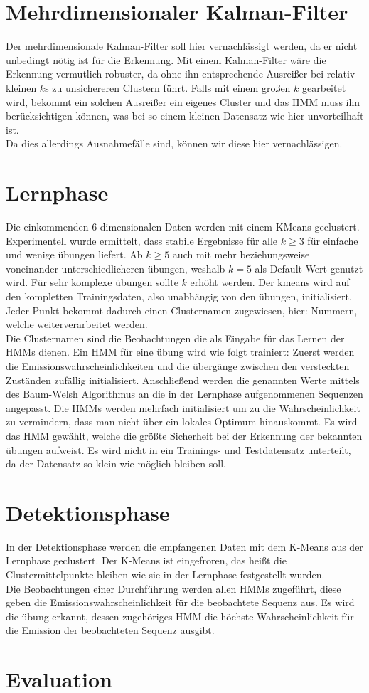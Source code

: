 \documentclass{article}
\begin{document}
\section{Mehrdimensionaler Kalman-Filter}
Der mehrdimensionale Kalman-Filter soll hier vernachl\"assigt werden, da er nicht unbedingt n\"otig ist f\"ur die Erkennung.
Mit einem Kalman-Filter w\"are die Erkennung vermutlich robuster, da ohne ihn entsprechende Ausreißer bei relativ kleinen $k$s zu unsichereren Clustern f\"uhrt.
Falls mit einem großen $k$ gearbeitet wird, bekommt ein solchen Ausreißer ein eigenes Cluster und das HMM muss ihn ber\"ucksichtigen k\"onnen, was bei so einem kleinen Datensatz wie hier unvorteilhaft ist.\\
Da dies allerdings Ausnahmef\"alle sind, k\"onnen wir diese hier vernachl\"assigen.

\section{Lernphase}
Die einkommenden 6-dimensionalen Daten werden mit einem KMeans geclustert.
Experimentell wurde ermittelt, dass stabile Ergebnisse f\"ur alle $k \geq 3$  f\"ur einfache und wenige \"ubungen liefert.
Ab $k \geq 5$ auch mit mehr beziehungsweise voneinander unterschiedlicheren \"ubungen, weshalb $k = 5$ als Default-Wert genutzt wird.
F\"ur sehr komplexe \"ubungen sollte $k$ erh\"oht werden.
Der kmeans wird auf den kompletten Trainingsdaten, also unabh\"angig von den \"ubungen, initialisiert.
Jeder Punkt bekommt dadurch einen Clusternamen zugewiesen, hier: Nummern, welche weiterverarbeitet werden.\\
Die Clusternamen sind die Beobachtungen die als Eingabe f\"ur das Lernen der HMMs dienen.
Ein HMM f\"ur eine \"ubung wird wie folgt trainiert:
Zuerst werden die Emissionswahrscheinlichkeiten und die \"uberg\"ange zwischen den versteckten Zust\"anden zuf\"allig initialisiert.
Anschließend werden die genannten Werte mittels des Baum-Welsh Algorithmus an die in der Lernphase aufgenommenen Sequenzen angepasst.
Die HMMs werden mehrfach initialisiert um zu die Wahrscheinlichkeit zu vermindern, dass man nicht \"uber ein lokales Optimum hinauskommt.
Es wird das HMM gew\"ahlt, welche die gr\"oßte Sicherheit bei der Erkennung der bekannten \"ubungen aufweist.
Es wird nicht in ein Trainings- und Testdatensatz unterteilt, da der Datensatz so klein wie m\"oglich bleiben soll.

\section{Detektionsphase}
In der Detektionsphase werden die empfangenen Daten mit dem K-Means aus der Lernphase geclustert.
Der K-Means ist eingefroren, das heißt die Clustermittelpunkte bleiben wie sie in der Lernphase festgestellt wurden.\\
Die Beobachtungen einer Durchf\"uhrung werden allen HMMs zugef\"uhrt, diese geben die Emissionswahrscheinlichkeit f\"ur die beobachtete Sequenz aus.
Es wird die \"ubung erkannt, dessen zugeh\"origes HMM die h\"ochste Wahrscheinlichkeit f\"ur die Emission der beobachteten Sequenz ausgibt.


\section{Evaluation}
\end{document}
